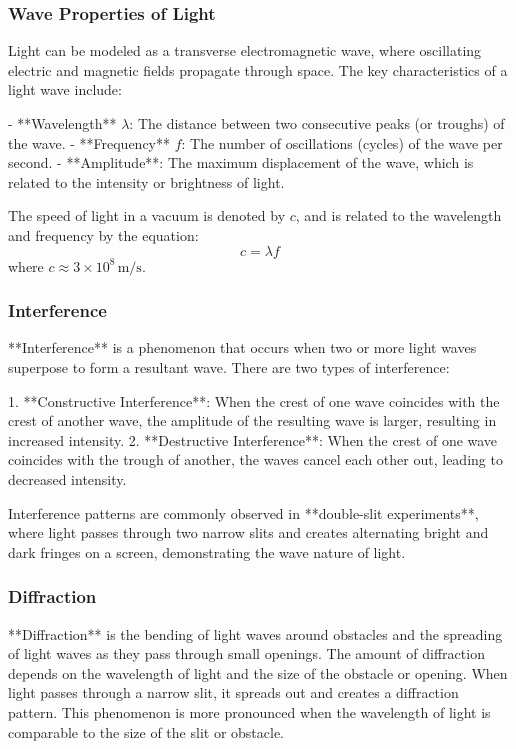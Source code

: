 \documentclass{article}
\begin{document}
\subsubsection*{Wave Properties of Light}

Light can be modeled as a transverse electromagnetic wave, where oscillating electric and magnetic fields propagate through space. The key characteristics of a light wave include:

- **Wavelength** \( \lambda \): The distance between two consecutive peaks (or troughs) of the wave.
- **Frequency** \( f \): The number of oscillations (cycles) of the wave per second.
- **Amplitude**: The maximum displacement of the wave, which is related to the intensity or brightness of light.

The speed of light in a vacuum is denoted by \( c \), and is related to the wavelength and frequency by the equation:
\[
c = \lambda f
\]
where \( c \approx 3 \times 10^8 \, \text{m/s} \).

\subsubsection*{Interference}

**Interference** is a phenomenon that occurs when two or more light waves superpose to form a resultant wave. There are two types of interference:

1. **Constructive Interference**: When the crest of one wave coincides with the crest of another wave, the amplitude of the resulting wave is larger, resulting in increased intensity.
2. **Destructive Interference**: When the crest of one wave coincides with the trough of another, the waves cancel each other out, leading to decreased intensity.

Interference patterns are commonly observed in **double-slit experiments**, where light passes through two narrow slits and creates alternating bright and dark fringes on a screen, demonstrating the wave nature of light.

\subsubsection*{Diffraction}

**Diffraction** is the bending of light waves around obstacles and the spreading of light waves as they pass through small openings. The amount of diffraction depends on the wavelength of light and the size of the obstacle or opening. When light passes through a narrow slit, it spreads out and creates a diffraction pattern. This phenomenon is more pronounced when the wavelength of light is comparable to the size of the slit or obstacle.
\end{document}
